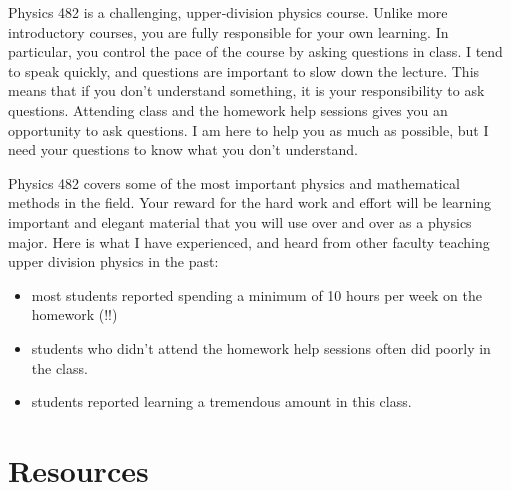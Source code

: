 \documentclass[letterpaper,10pt,english]{jupyterBook}
\begin{document}
\sphinxAtStartPar
Physics 482 is a challenging, upper‐division physics course. Unlike more
introductory courses, you are fully responsible for your own learning.
In particular, you control the pace of the course by asking questions in
class. I tend to speak quickly, and questions are important to slow down
the lecture. This means that if you don’t understand something, it is
your responsibility to ask questions. Attending class and the homework
help sessions gives you an opportunity to ask questions. I am here to
help you as much as possible, but I need your questions to know what you
don’t understand.

\sphinxAtStartPar
Physics 482 covers some of the most important physics and mathematical
methods in the field. Your reward for the hard work and effort will be
learning important and elegant material that you will use over and over
as a physics major. Here is what I have experienced, and heard from
other faculty teaching upper division physics in the past:
\begin{itemize}
\item {} 
\sphinxAtStartPar
most students reported spending a minimum of 10 hours per week on the
homework (!!)

\item {} 
\sphinxAtStartPar
students who didn’t attend the homework help sessions
often did poorly in the class.

\item {} 
\sphinxAtStartPar
students reported learning a tremendous amount in this class.

\end{itemize}

\sphinxAtStartPar
{}

\sphinxstepscope


\section{Resources}
\label{\detokenize{content/0_course/resources:resources}}\label{\detokenize{content/0_course/resources::doc}}
\end{document}
